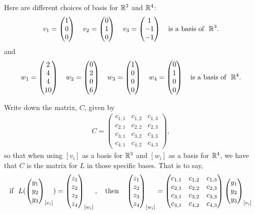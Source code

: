 \begin{question}
	\normalfont
	
	Here are different choices of basis for ${\mathbb R}^3$ and ${\mathbb R}^4$:
	\begin{align*}
		v_1 = \ColVecThree{1}{0}{0}\ \ \ 
		v_2 = \ColVecThree{0}{1}{0}\ \ \ 
		v_3 = \ColVecThree{1}{-1}{-1}\ \ \
		\text{is a basis of}\ \ \real^3. 
	\end{align*}
	and
	\begin{align*}
		w_1 = \ColVecFour{2}{4}{4}{10}\ \ \ 
		w_2 = \ColVecFour{0}{2}{0}{6}\ \ \ 
		w_3 = \ColVecFour{1}{0}{0}{0}\ \ \
		w_4 = \ColVecFour{0}{1}{0}{0}\ \ \
		\text{is a basis of}\ \ \real^4. 
	\end{align*}
	
	
	Write down the matrix, $C$, given by 
	\begin{align*}
			C = 
			 \begin{pmatrix}
			  c_{1,1} & c_{1,2} & c_{1,3} \\
			  c_{2,1} & c_{2,2} & c_{2,3} \\
			  c_{3,1} & c_{3,2} & c_{3,3} \\
			  c_{4,1} & c_{4,2} & c_{4,3} 
			 \end{pmatrix},
	\end{align*}
	so that when using $[v_i]$ as a basis for ${\mathbb R}^3$ and $[w_i]$ as a basis for ${\mathbb R}^4$, we have that $C$ is the matrix for $L$ in those specific bases.  That is to say, 
	\begin{align*}
		\text{if}\ \ L(\ColVecThree{y_1}{y_2}{y_3}_{[v_i]}) = \ColVecFour{z_1}{z_2}{z_3}{z_4}_{[w_i]},\ \ \ 
	\text{then}\ \ \ 
		\ColVecFour{z_1}{z_2}{z_3}{z_4}_{[w_i]} = 
	 \begin{pmatrix}
	  c_{1,1} & c_{1,2} & c_{1,3} \\
	  c_{2,1} & c_{2,2} & c_{2,3} \\
	  c_{3,1} & c_{3,2} & c_{3,3} \\
	  c_{4,1} & c_{4,2} & c_{4,3} 
	 \end{pmatrix}
	 \ColVecThree{y_1}{y_2}{y_3}_{[v_i]}
	\end{align*}
\end{question}